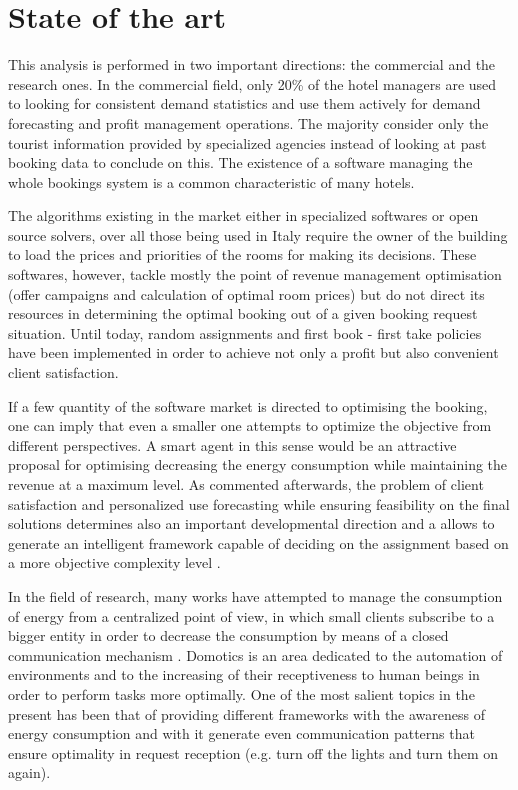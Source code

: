 \section{State of the art}
This analysis is performed in two important directions: the commercial and the research ones. In the commercial field, only 20\% of the hotel managers are used to looking for consistent demand statistics and use them actively for demand forecasting and profit management operations. The majority consider only the tourist information provided by specialized agencies instead of looking at past booking data to conclude on this. The existence of a software managing the whole bookings system is a common characteristic of many hotels. 

The algorithms existing in the market either in specialized softwares or open source solvers, over all those being used in Italy require the owner of the building to load the prices and priorities of the rooms for making its decisions. These softwares, however, tackle mostly the point of revenue management optimisation (offer campaigns and calculation of optimal room prices) but do not direct its resources in determining the optimal booking out of a given booking request situation. Until today, random assignments and first book - first take policies have been implemented in order to achieve not only a profit but also convenient client satisfaction.

If a few quantity of the software market is directed to optimising the booking, one can imply that even a smaller one attempts to optimize the objective from different perspectives. A smart agent in this sense would be an attractive proposal for optimising decreasing the energy consumption while maintaining the revenue at a maximum level. As commented afterwards, the problem of client satisfaction and personalized use forecasting while ensuring feasibility on the final solutions determines also an important developmental direction and a allows to generate an intelligent framework capable of deciding on the assignment based on a more objective complexity level \cite{grids}.

In the field of research, many works have attempted to manage the consumption of energy from a centralized point of view, in which small clients subscribe to a bigger entity in order to decrease the consumption by means of a closed communication mechanism \cite{central}. Domotics is an area dedicated to the automation of environments and to the increasing of their receptiveness to human beings in order to perform tasks more optimally. One of the most salient topics in the present has been that of providing different frameworks with the awareness of energy consumption and with it generate even communication patterns that ensure optimality in request reception (e.g. turn off the lights and turn them on again)\cite{web}.

